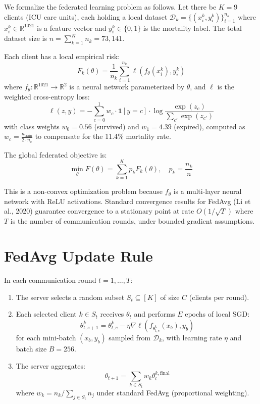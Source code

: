 \documentclass[11pt,a4paper]{report}
\begin{document}
We formalize the federated learning problem as follows. Let there be $K=9$ clients (ICU care units), each holding a local dataset $\mathcal{D}_k = \{(x_i^k, y_i^k)\}_{i=1}^{n_k}$ where $x_i^k \in \mathbb{R}^{1021}$ is a feature vector and $y_i^k \in \{0, 1\}$ is the mortality label. The total dataset size is $n = \sum_{k=1}^K n_k = 73{,}141$.

Each client has a local empirical risk:
\begin{equation}
F_k(\theta) = \frac{1}{n_k} \sum_{i=1}^{n_k} \ell(f_\theta(x_i^k), y_i^k)
\label{eq:local_risk}
\end{equation}
where $f_\theta: \mathbb{R}^{1021} \to \mathbb{R}^2$ is a neural network parameterized by $\theta$, and $\ell$ is the weighted cross-entropy loss:
\begin{equation}
\ell(z, y) = -\sum_{c=0}^{1} w_c \cdot \mathbf{1}[y=c] \cdot \log\frac{\exp(z_c)}{\sum_{c'} \exp(z_{c'})}
\label{eq:wce}
\end{equation}
with class weights $w_0 = 0.56$ (survived) and $w_1 = 4.39$ (expired), computed as $w_c = \frac{n_{\text{train}}}{2 \cdot n_c}$ to compensate for the 11.4\% mortality rate.

The global federated objective is:
\begin{equation}
\min_\theta F(\theta) = \sum_{k=1}^{K} p_k F_k(\theta), \quad p_k = \frac{n_k}{n}
\label{eq:global_obj}
\end{equation}

This is a non-convex optimization problem because $f_\theta$ is a multi-layer neural network with ReLU activations. Standard convergence results for FedAvg (Li et al., 2020) guarantee convergence to a stationary point at rate $O(1/\sqrt{T})$ where $T$ is the number of communication rounds, under bounded gradient assumptions.

\section{FedAvg Update Rule}

In each communication round $t = 1, \ldots, T$:

\begin{enumerate}[leftmargin=2em]
\item The server selects a random subset $S_t \subseteq [K]$ of size $C$ (clients per round).
\item Each selected client $k \in S_t$ receives $\theta_t$ and performs $E$ epochs of local SGD:
\begin{equation}
\theta_{t,e+1}^k = \theta_{t,e}^k - \eta \nabla \ell(f_{\theta_{t,e}^k}(x_b), y_b)
\end{equation}
for each mini-batch $(x_b, y_b)$ sampled from $\mathcal{D}_k$, with learning rate $\eta$ and batch size $B=256$.
\item The server aggregates:
\begin{equation}
\theta_{t+1} = \sum_{k \in S_t} w_k \theta_t^{k,\text{final}}
\end{equation}
where $w_k = n_k / \sum_{j \in S_t} n_j$ under standard FedAvg (proportional weighting).
\end{enumerate}
\end{document}
